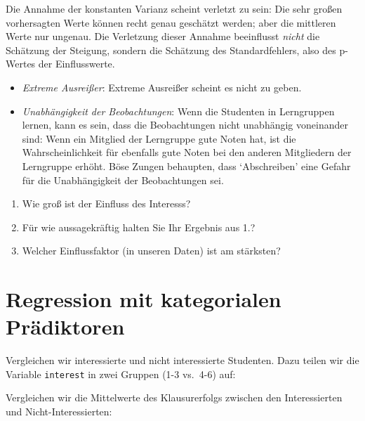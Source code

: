 \documentclass[12pt,ngerman,]{book}
\makeatletter
\newenvironment{Shaded}{\begin{snugshade}}{\end{snugshade}}
\newcommand{\DecValTok}[1]{\textcolor[rgb]{0.00,0.00,0.81}{{#1}}}
\newcommand{\StringTok}[1]{\textcolor[rgb]{0.31,0.60,0.02}{{#1}}}
\newcommand{\NormalTok}[1]{{#1}}
\newenvironment{kframe}{%
\medskip{}
\setlength{\fboxsep}{.8em}
 \def\at@end@of@kframe{}%
 \ifinner\ifhmode%
  \def\at@end@of@kframe{\end{minipage}}%
  \begin{minipage}{\columnwidth}%
 \fi\fi%
 \def\FrameCommand##1{\hskip\@totalleftmargin \hskip-\fboxsep
 \colorbox{shadecolor}{##1}\hskip-\fboxsep
     \hskip-\linewidth \hskip-\@totalleftmargin \hskip\columnwidth}%
 \MakeFramed {\advance\hsize-\width
   \@totalleftmargin\z@ \linewidth\hsize
   \@setminipage}}%
 {\par\unskip\endMakeFramed%
 \at@end@of@kframe}
\renewenvironment{Shaded}{\begin{kframe}}{\end{kframe}}
\theoremstyle{definition}
\theoremstyle{definition}
\theoremstyle{remark}
\let\BeginKnitrBlock\begin \let\EndKnitrBlock\end
\makeatother
\begin{document}
Die Annahme der konstanten Varianz scheint verletzt zu sein: Die sehr
großen vorhersagten Werte können recht genau geschätzt werden; aber die
mittleren Werte nur ungenau. Die Verletzung dieser Annahme beeinflusst
\emph{nicht} die Schätzung der Steigung, sondern die Schätzung des
Standardfehlers, also des p-Wertes der Einflusswerte.

\begin{itemize}
\item
  \emph{Extreme Ausreißer}: Extreme Ausreißer scheint es nicht zu geben.
\item
  \emph{Unabhängigkeit der Beobachtungen}: Wenn die Studenten in
  Lerngruppen lernen, kann es sein, dass die Beobachtungen nicht
  unabhängig voneinander sind: Wenn ein Mitglied der Lerngruppe gute
  Noten hat, ist die Wahrscheinlichkeit für ebenfalls gute Noten bei den
  anderen Mitgliedern der Lerngruppe erhöht. Böse Zungen behaupten, dass
  `Abschreiben' eine Gefahr für die Unabhängigkeit der Beobachtungen
  sei.
\end{itemize}

\BeginKnitrBlock{rmdexercises}
\begin{enumerate}
\def\labelenumi{\arabic{enumi}.}
\item
  Wie groß ist der Einfluss des Interesss?
\item
  Für wie aussagekräftig halten Sie Ihr Ergebnis aus 1.?
\item
  Welcher Einflussfaktor (in unseren Daten) ist am stärksten?
\end{enumerate}
\EndKnitrBlock{rmdexercises}

\section{Regression mit kategorialen
Prädiktoren}\label{regression-mit-kategorialen-pradiktoren}

Vergleichen wir interessierte und nicht interessierte Studenten. Dazu
teilen wir die Variable \texttt{interest} in zwei Gruppen (1-3 vs.~4-6)
auf:

\begin{Shaded}
\end{Shaded}

Vergleichen wir die Mittelwerte des Klausurerfolgs zwischen den
Interessierten und Nicht-Interessierten:
\end{document}
